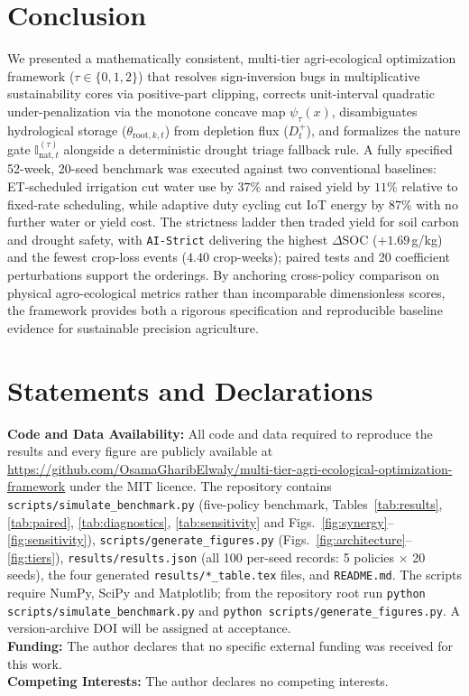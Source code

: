 \documentclass[11pt,a4paper]{article}
\newcommand{\Inatt}{\mathbb{I}_{\mathrm{nat},t}}
\begin{document}
\section{Conclusion}
We presented a mathematically consistent, multi-tier agri-ecological optimization framework ($\tau \in \{0,1,2\}$) that resolves sign-inversion bugs in multiplicative sustainability cores via positive-part clipping, corrects unit-interval quadratic under-penalization via the monotone concave map $\psi_\tau(x)$, disambiguates hydrological storage ($\theta_{\mathrm{root},k,t}$) from depletion flux ($D_t^+$), and formalizes the nature gate $\Inatt^{(\tau)}$ alongside a deterministic drought triage fallback rule. A fully specified 52-week, 20-seed benchmark was executed against two conventional baselines: ET-scheduled irrigation cut water use by $37\%$ and raised yield by $11\%$ relative to fixed-rate scheduling, while adaptive duty cycling cut IoT energy by $87\%$ with no further water or yield cost. The strictness ladder then traded yield for soil carbon and drought safety, with \texttt{AI-Strict} delivering the highest $\Delta$SOC ($+1.69$\,g/kg) and the fewest crop-loss events ($4.40$ crop-weeks); paired tests and 20 coefficient perturbations support the orderings. By anchoring cross-policy comparison on physical agro-ecological metrics rather than incomparable dimensionless scores, the framework provides both a rigorous specification and reproducible baseline evidence for sustainable precision agriculture.

\section*{Statements and Declarations}
\noindent\textbf{Code and Data Availability:} All code and data required to reproduce the results and every figure are publicly available at \url{https://github.com/OsamaGharibElwaly/multi-tier-agri-ecological-optimization-framework} under the MIT licence. The repository contains \texttt{scripts/simulate\_benchmark.py} (five-policy benchmark, Tables~\ref{tab:results}, \ref{tab:paired}, \ref{tab:diagnostics}, \ref{tab:sensitivity} and Figs.~\ref{fig:synergy}--\ref{fig:sensitivity}), \texttt{scripts/generate\_figures.py} (Figs.~\ref{fig:architecture}--\ref{fig:tiers}), \texttt{results/results.json} (all 100 per-seed records: 5 policies $\times$ 20 seeds), the four generated \texttt{results/*\_table.tex} files, and \texttt{README.md}. The scripts require NumPy, SciPy and Matplotlib; from the repository root run \texttt{python scripts/simulate\_benchmark.py} and \texttt{python scripts/generate\_figures.py}. A version-archive DOI will be assigned at acceptance.\\
\noindent\textbf{Funding:} The author declares that no specific external funding was received for this work.\\
\noindent\textbf{Competing Interests:} The author declares no competing interests.
\end{document}
